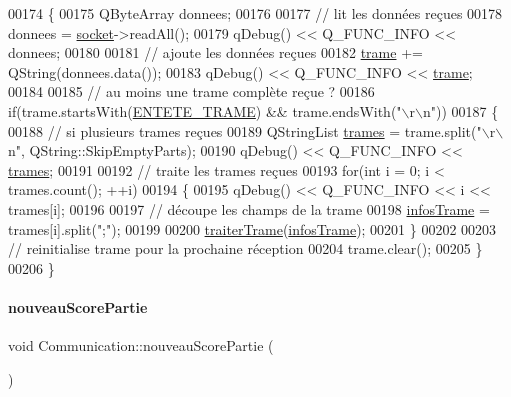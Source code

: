 \begin{DoxyCode}
00174 \{
00175     QByteArray donnees;
00176 
00177     \textcolor{comment}{// lit les données reçues}
00178     donnees = \hyperlink{class_communication_aa4ddc3151b305db0135d5826384645cc}{socket}->readAll();
00179     qDebug() << Q\_FUNC\_INFO << donnees;
00180 
00181     \textcolor{comment}{// ajoute les données reçues}
00182     \hyperlink{class_communication_ac8f5004bfaaf7f538ba5ae93255f772b}{trame} += QString(donnees.data());
00183     qDebug() << Q\_FUNC\_INFO << \hyperlink{class_communication_ac8f5004bfaaf7f538ba5ae93255f772b}{trame};
00184 
00185     \textcolor{comment}{// au moins une trame complète reçue ?}
00186     \textcolor{keywordflow}{if}(trame.startsWith(\hyperlink{_communication_8h_a226742d7ade287673fb2295df90f462b}{ENTETE\_TRAME}) && trame.endsWith(\textcolor{stringliteral}{"\(\backslash\)r\(\backslash\)n"}))
00187     \{
00188         \textcolor{comment}{// si plusieurs trames reçues}
00189         QStringList \hyperlink{class_communication_a89b75dc8f2d3427478660b45c01f4186}{trames} = trame.split(\textcolor{stringliteral}{"\(\backslash\)r\(\backslash\)n"}, QString::SkipEmptyParts);
00190         qDebug() << Q\_FUNC\_INFO << \hyperlink{class_communication_a89b75dc8f2d3427478660b45c01f4186}{trames};
00191 
00192         \textcolor{comment}{// traite les trames reçues}
00193         \textcolor{keywordflow}{for}(\textcolor{keywordtype}{int} i = 0; i < trames.count(); ++i)
00194         \{
00195             qDebug() << Q\_FUNC\_INFO << i << trames[i];
00196 
00197             \textcolor{comment}{// découpe les champs de la trame}
00198             \hyperlink{class_communication_a219fe9a4cd04470241f26f1f6159d721}{infosTrame} = trames[i].split(\textcolor{stringliteral}{";"});
00199 
00200             \hyperlink{class_communication_a1f17fd8330b55b3ab30263d15e6e740b}{traiterTrame}(\hyperlink{class_communication_a219fe9a4cd04470241f26f1f6159d721}{infosTrame});
00201         \}
00202 
00203         \textcolor{comment}{// reinitialise trame pour la prochaine réception}
00204         trame.clear();
00205     \}
00206 \}
\end{DoxyCode}
\mbox{\label{class_communication_acf4446d47652e0c508296e52df6fb11b}} 
\paragraph{\texorpdfstring{nouveau\+Score\+Partie}{nouveauScorePartie}}
{\footnotesize\ttfamily void Communication\+::nouveau\+Score\+Partie (\begin{DoxyParamCaption}{ }\end{DoxyParamCaption})\hspace{0.3cm}{\ttfamily [signal]}}



